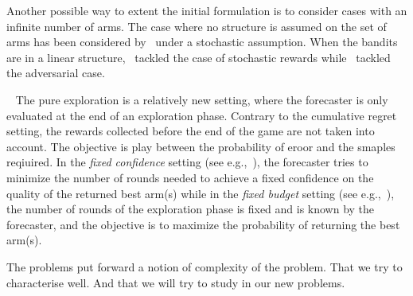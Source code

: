 Another possible way to extent the initial formulation is to consider cases with an infinite number of arms.
The case where no structure is assumed on the set of arms has been considered by~\cite{Wang08AI} under a stochastic assumption. When the bandits are in a linear structure,~\cite{Abbasi-Yadkori11IA} tackled the case of stochastic rewards while~\cite{Dani07TP} tackled the adversarial case. 

\textbullet~ The pure exploration is a relatively new setting, where the forecaster is only evaluated at the end of an exploration phase. Contrary to the cumulative regret setting, the rewards collected before the end of the game are not taken into account. 
The objective is  play between the probability of eroor and the smaples reqiuired. 
In the \textit{fixed confidence} setting (see e.g.,~\cite{Maron93HR,Even-Dar06AE}), the forecaster tries to minimize the number of rounds needed to achieve a fixed confidence on the quality of the returned best arm(s) while in the \textit{fixed budget} setting (see e.g.,~\cite{Bubeck09PE,Audibert10BA}), the number of rounds of the exploration phase is fixed and is known by the forecaster, and the objective is to maximize the probability of returning the best arm(s). 

The problems put forward a notion of complexity of the problem. That we try to characterise well. And that we will try to study in our new problems.

